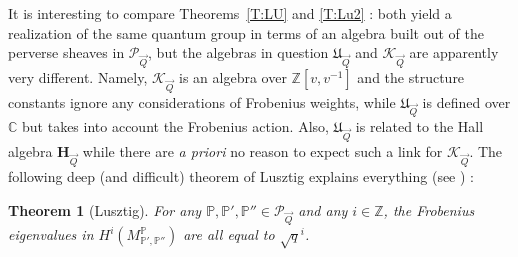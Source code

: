 \documentclass[a4paper,10pt]{amsart}
\def\Z{\mathbb{Z}}
\def\H{\mathbf{H}}
\def\C{\mathbb{C}}
\def\PQ{\mathcal{P}_{\vec{Q}}}
\def\KQ{\mathcal{K}_{\vec{Q}}}
\newtheorem{theo}{\bf{Theorem}}[section]
\numberwithin{equation}{section}
\begin{document}
\vspace{.1in}

It is interesting to compare Theorems~\ref{T:LU} and \ref{T:Lu2} : both yield
a realization of the same quantum group in terms of an algebra built out
of the perverse sheaves in $\PQ$, but the algebras in question
$\mathfrak{U}_{\vec{Q}}$ and $\KQ$ are apparently very different. Namely,
$\KQ$ is an algebra over $\Z[v,v^{-1}]$ and the structure constants ignore
any considerations of Frobenius weights, while $\mathfrak{U}_{\vec{Q}}$ is
defined over $\C$ but takes into account the Frobenius action. Also,
$\mathfrak{U}_{\vec{Q}}$ is related to the Hall algebra $\H_{\vec{Q}}$ while
there are \textit{a priori} no reason to expect such a link for $\KQ$. The
following deep (and difficult) theorem of Lusztig explains everything (see
\cite{LusHall}) :

\vspace{.1in}

\begin{theo}[Lusztig]\label{T:LUweights} For any $\mathbb{P}, \mathbb{P}',
\mathbb{P}'' \in \PQ$ and any $i\in \Z$, the Frobenius eigenvalues in
$H^i( M^{\mathbb{P}}_{\mathbb{P}',\mathbb{P}''})$ are all equal to
$\sqrt{q}^i$.
\end{theo}

\vspace{.1in}
\end{document}
